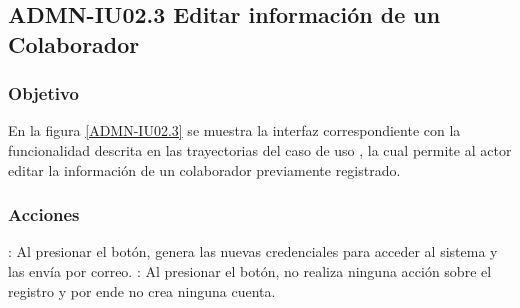 \clearpage
\subsection{ADMN-IU02.3 Editar información de un Colaborador}

\subsubsection{Objetivo}
En la figura \ref{ADMN-IU02.3} se muestra la interfaz correspondiente con la funcionalidad descrita en las
trayectorias del caso de uso , la cual permite al actor editar la información de un colaborador previamente registrado.


\subsubsection{Acciones}
\Titem {} : Al presionar el botón, genera las nuevas credenciales para acceder al sistema y las envía por correo.
\Titem {} : Al presionar el botón, no realiza ninguna acción sobre el registro y por ende no crea ninguna cuenta.



\clearpage
